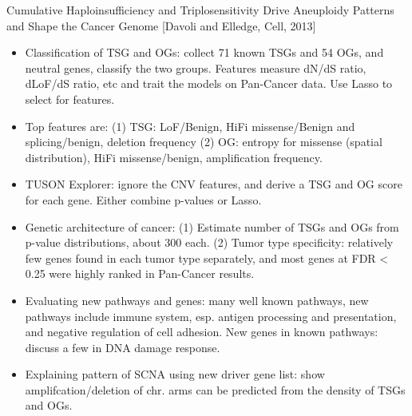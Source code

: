 \documentclass{report}
\begin{document}
Cumulative Haploinsufficiency and Triplosensitivity Drive Aneuploidy Patterns and Shape the Cancer Genome [Davoli and Elledge, Cell, 2013]
\begin{itemize}
	
	\item Classification of TSG and OGs: collect 71 known TSGs and 54 OGs, and neutral genes, classify the two groups. Features measure dN/dS ratio, dLoF/dS ratio, etc and trait the models on Pan-Cancer data. Use Lasso to select for features.
	
	\item Top features are: (1) TSG: LoF/Benign, HiFi missense/Benign and splicing/benign, deletion frequency (2) OG: entropy for missense (spatial distribution), HiFi missense/benign, amplification frequency.  
	
	\item TUSON Explorer: ignore the CNV features, and derive a TSG and OG score for each gene. Either combine p-values or Lasso. 
	
	\item Genetic architecture of cancer: (1) Estimate number of TSGs and OGs from p-value distributions, about 300 each. (2) Tumor type specificity: relatively few genes found in each tumor type separately, and most genes at FDR < 0.25 were highly ranked in Pan-Cancer results. 
	
	\item Evaluating new pathways and genes: many well known pathways, new pathways include immune system, esp. antigen processing and presentation, and negative regulation of cell adhesion. New genes in known pathways: discuss a few in DNA damage response. 
	
	\item Explaining pattern of SCNA using new driver gene list: show amplifcation/deletion of chr. arms can be predicted from the density of TSGs and OGs. 
\end{itemize}
\end{document}

